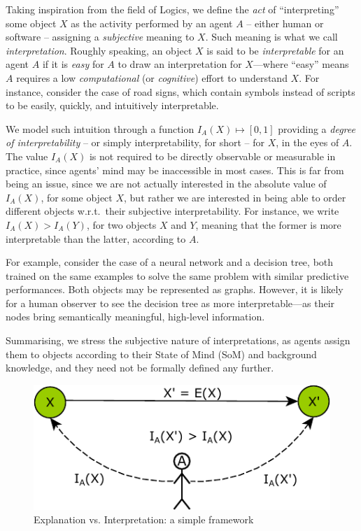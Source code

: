 \documentclass[12pt,a4paper,openright,twoside]{book}
\begin{document}
Taking inspiration from the field of Logics, we define the \emph{act} of ``interpreting'' some object $X$ as the activity performed by an agent $A$ -- either human or software -- assigning a \emph{subjective} meaning to $X$.
%
Such meaning is what we call \emph{interpretation}.
%
Roughly speaking, an object $X$ is said to be  \emph{interpretable} for an agent $A$ if it is \emph{easy} for $A$ to draw an interpretation for $X$---where ``easy'' means $A$ requires a low \emph{computational} (or \emph{cognitive}) effort to understand $X$.
%
For instance, consider the case of road signs, which contain symbols instead of scripts to be easily, quickly, and intuitively interpretable.

We model such intuition through a function $I_A(X) \mapsto [0, 1]$ providing a \emph{degree of interpretability} -- or simply interpretability, for short -- for $X$, in the eyes of $A$.
%
The value $I_A(X)$ is not required to be directly observable or measurable in practice, since agents' mind may be inaccessible in most cases.
%
This is far from being an issue, since we are not actually interested in the absolute value of $I_A(X)$, for some object $X$, but rather we are interested in being able to order different objects w.r.t.\ their subjective interpretability.
%
For instance, we write $I_A(X) > I_A(Y)$, for two objects $X$ and $Y$, meaning that the former is more interpretable than the latter, according to $A$.

For example, consider the case of a neural network and a decision tree, both trained on the same examples to solve the same problem with similar predictive performances.
%
Both objects may be represented as graphs.
%
However, it is likely for a human observer to see the decision tree as more interpretable---as their nodes bring semantically meaningful, high-level information.

Summarising, we stress the subjective nature of interpretations, as agents assign them to objects according to their State of Mind (SoM) \cite{PremackW1978} and background knowledge, and they need not be formally defined any further.

\begin{figure}
    \centering
    \includegraphics[width=.5\linewidth]{figures/framework.pdf}
    \caption{Explanation vs. Interpretation: a simple framework}
    \label{fig:framework}
\end{figure}
\end{document}
